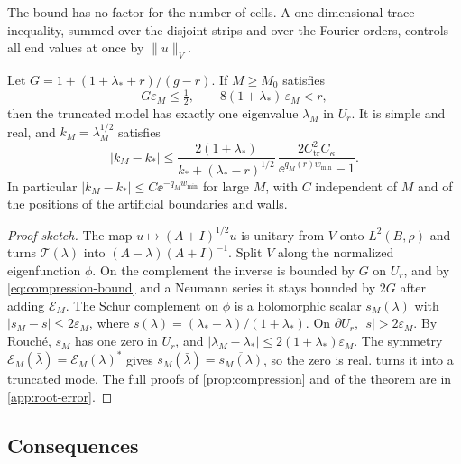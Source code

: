 The bound has no factor for the number of cells. A one-dimensional trace
inequality, summed over the disjoint strips and over the Fourier orders,
controls all end values at once by $\|u\|_V$.

\begin{theorem}\label{thm:root-error}
Let $G=1+(1+\lambda_*+r)/(g-r)$. If $M\ge M_0$ satisfies
\begin{equation}\label{eq:M-condition}
  G\varepsilon_M\le\tfrac12,\qquad 8(1+\lambda_*)\,\varepsilon_M<r,
\end{equation}
then the truncated model has exactly one eigenvalue $\lambda_M$ in $U_r$. It is
simple and real, and $k_M=\lambda_M^{1/2}$ satisfies
\begin{equation}\label{eq:root-error}
  |k_M-k_*|\le\frac{2(1+\lambda_*)}{k_*+(\lambda_*-r)^{1/2}}\,
  \frac{2C_{\mathrm{tr}}^2C_\kappa}{\ee^{q_M(r)w_{\min}}-1}.
\end{equation}
In particular $|k_M-k_*|\le C\ee^{-q_Mw_{\min}}$ for large $M$, with $C$
independent of $M$ and of the positions of the artificial boundaries and walls.
\end{theorem}

\begin{proof}[Proof sketch]
The map $u\mapsto(A+I)^{1/2}u$ is unitary from $V$ onto $L^2(B,\rho)$ and turns
$\mathcal T(\lambda)$ into $(A-\lambda)(A+I)^{-1}$. Split $V$ along the normalized
eigenfunction $\phi$. On the complement the inverse is bounded by $G$ on $U_r$,
and by \eqref{eq:compression-bound} and a Neumann series it stays bounded by
$2G$ after adding $\mathcal E_M$. The Schur complement on $\phi$ is a holomorphic
scalar $s_M(\lambda)$ with $|s_M-s|\le2\varepsilon_M$, where
$s(\lambda)=(\lambda_*-\lambda)/(1+\lambda_*)$. On $\partial U_r$, $|s|>2\varepsilon_M$. By Rouché,
$s_M$ has one zero in $U_r$, and $|\lambda_M-\lambda_*|\le2(1+\lambda_*)\varepsilon_M$. The
symmetry $\mathcal E_M(\bar\lambda)=\mathcal E_M(\lambda)^*$ gives
$s_M(\bar\lambda)=\overline{s_M(\lambda)}$, so the zero is real.
 turns it into a truncated mode. The full proofs of
\cref{prop:compression} and of the theorem are in \cref{app:root-error}.
\end{proof}

\subsection{Consequences}


